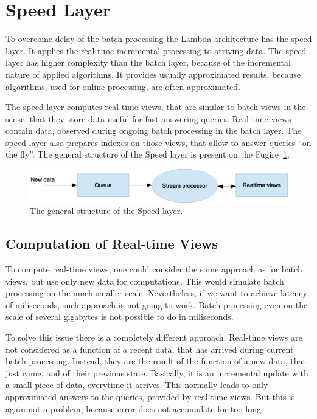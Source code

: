 \section{Speed Layer}
\label{sec:speed_layer}

To overcome delay of the batch processing the Lambda architecture has the speed layer.
It applies the real-time incremental processing to arriving data.
The speed layer has higher complexity than the batch layer, because of the incremental nature of applied algorithms.
It provides usually approximated results, because algorithms, used for online processing, are often approximated.

The speed layer computes real-time views, that are similar to batch views in the sense, that they store data useful for fast answering queries.
Real-time views contain data, observed during ongoing batch processing in the batch layer.
The speed layer also prepares indexes on those views, that allow to answer queries ``on the fly''.
The general structure of the Speed layer is present on the Fugire~\ref{fig:SpeedLayer}.

\begin{figure}[h]
  \centering
  \includegraphics [width=1.0\textwidth]{images/SpeedLayer}
  \caption{The general structure of the Speed layer.}
  \label{fig:SpeedLayer}
\end{figure}

\subsection{Computation of Real-time Views}

To compute real-time views, one could consider the same approach as for batch views, but use only new data for computations.
This would simulate batch processing on the much smaller scale.
Nevertheless, if we want to achieve latency of miliseconds, such approach is not going to work.
Batch processing even on the scale of several gigabytes is not possible to do in miliseconds.

To solve this issue there is a completely different approach.
Real-time views are not considered as a function of a recent data, that has arrived during current batch processing.
Instead, they are the result of the function of a new data, that just came, and of their previous state.
Basically, it is an incremental update with a small piece of data, everytime it arrives.
This normally leads to only approximated answers to the queries, provided by real-time views.
But this is again not a problem, because error does not accumulate for too long.

